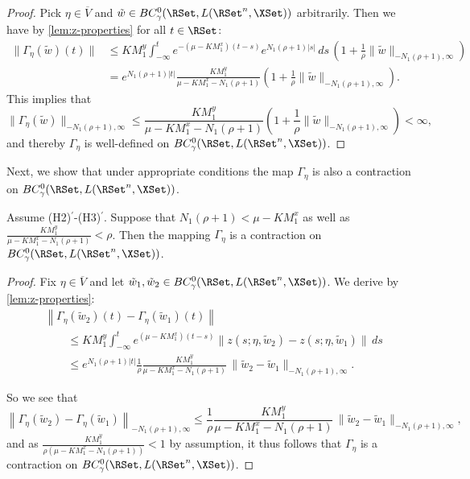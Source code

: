 \documentclass[a4paper]{siamart190516}
\begin{document}
 \begin{proof}
 Pick $\eta \in \overline{V}$ and $\tilde{w} \in BC^0_{\gamma}(\RSet, L(\RSet^n,
 \XSet))$ arbitrarily. Then we have by \cref{lem:z-properties} for all $t \in \RSet$:
 \begin{align*}
 \| \Gamma_{\eta}(\tilde{w})(t) \| &\leq K M^y_1 \int_{-\infty}^t e^{-(\mu-K M^x_1)(t-s)} e^{N_1(\rho+1)|s|} \, ds \, \left( 1 + \frac{1}{\rho}\|\tilde{w}\|_{-N_1(\rho+1),\infty} \right) \\
 &= e^{N_1(\rho+1)|t|} \frac{K M^y_1}{\mu-K M^x_1-N_1 (\rho+1)} \left( 1 + \frac{1}{\rho} \|\tilde{w}\|_{-N_1(\rho+1),\infty} \right).
 \end{align*}
 This implies that 
 \[
  \| \Gamma_{\eta}(\tilde{w}) \|_{-N_1(\rho+1),\infty} \leq \frac{K M^y_1}{\mu-K M^x_1-N_1 (\rho+1)} \left( 1 + \frac{1}{\rho} \|\tilde{w}\|_{-N_1(\rho+1),\infty} \right) < \infty,
 \]
 and thereby $\Gamma_{\eta}$ is well-defined on $ BC^0_{\gamma}(\RSet, L(\RSet^n, \XSet))$. 
 \end{proof}
 
 Next, we show that under appropriate conditions the map $\Gamma_{\eta}$ is also a contraction on  $BC^0_{\gamma}(\RSet, L(\RSet^n, \XSet))$.

 \begin{lemma}\label{lem:gamma-contraction}
 Assume (H2)$^\prime$-(H3)$^\prime$. Suppose that $N_1(\rho+1) < \mu - K M^x_1$ as well as $\frac{K M^y_1}{\mu-K M^x_1-N_1 (\rho+1)} < \rho$. Then the mapping $\Gamma_{\eta}$ is a contraction on  $BC^0_{\gamma}(\RSet, L(\RSet^n, \XSet))$.
 \end{lemma}

 \begin{proof}
 Fix $\eta \in \overline{V}$ and let $\tilde{w}_1, \tilde{w}_2 \in
 BC_{\gamma}^{0}(\RSet, L(\RSet^n,\XSet))$. We derive by \cref{lem:z-properties}:
 \begin{align*}
 &\left\|  \Gamma_{\eta}(\tilde{w}_2)(t) -\Gamma_{\eta}(\tilde{w}_1)(t)  \right\| \\
 &\qquad \leq K M^y_1 \int_{-\infty}^t e^{(\mu-K M^x_1)(t-s)} \| z(s;\eta,\tilde{w}_2) - z(s; \eta, \tilde{w}_1)\| \, ds \\
&\qquad \leq e^{N_1(\rho+1)|t|} \frac{1}{\rho} \frac{K M^y_1 }{\mu-K M^x_1-N_1(\rho+1)} \, \|\tilde{w}_2 - \tilde{w}_1\|_{-N_1(\rho+1),\infty}.
 \end{align*}
 
So we see that
\[
\left\|  \Gamma_{\eta}(\tilde{w}_2) -\Gamma_{\eta}(\tilde{w}_1)  \right\|_{-N_1(\rho+1),\infty} \leq \frac{1}{\rho} \frac{K M^y_1 }{\mu-K M^x_1-N_1(\rho+1)} \, \|\tilde{w}_2-\tilde{w}_1\|_{-N_1(\rho+1),\infty},
\]
and as  $\frac{K M^y_1}{\rho(\mu-K M^x_1-N_1 (\rho+1))} < 1$ by assumption, it thus follows that $\Gamma_{\eta}$ is a contraction on $BC^0_{\gamma}(\RSet, L(\RSet^n, \XSet))$.
 \end{proof}
 
\end{document}
